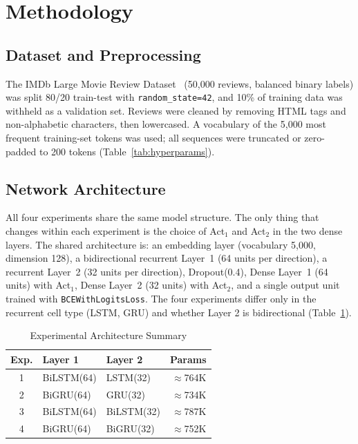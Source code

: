 \FloatBarrier
\section{Methodology}
\subsection{Dataset and Preprocessing}

The IMDb Large Movie Review Dataset~\cite{maas2011} (50,000
reviews, balanced binary labels) was split 80/20 train-test
with \texttt{random\_state=42}, and 10\% of
training data was withheld as a validation set. Reviews were
cleaned by removing HTML tags and non-alphabetic characters,
then lowercased. A vocabulary of the 5,000 most frequent
training-set tokens was used; all sequences were truncated or
zero-padded to 200 tokens (Table~\ref{tab:hyperparams}).

\subsection{Network Architecture}

All four experiments share the same model structure. The
only thing that changes within each experiment is the choice of
Act$_1$ and Act$_2$ in the two dense layers. The shared architecture
is: an embedding layer
(vocabulary 5,000, dimension 128), a bidirectional recurrent
Layer~1 (64 units per direction), a recurrent Layer~2 (32
units per direction), Dropout(0.4), Dense Layer~1 (64 units)
with Act$_1$, Dense Layer~2 (32 units) with Act$_2$, and a
single output unit trained with \texttt{BCEWithLogitsLoss}.
The four experiments differ only in the recurrent cell type
(LSTM, GRU) and whether Layer 2
is bidirectional (Table~\ref{tab:architectures}).

\begin{table}[htbp]
  \caption{Experimental Architecture Summary}
  \label{tab:architectures}
  \centering
  \footnotesize
  \setlength{\tabcolsep}{4pt}
  \renewcommand{\arraystretch}{1.08}
  \begin{tabular}{cllr}
    \toprule
    Exp. & Layer 1 & Layer 2 & Params \\
    \midrule
    1 & BiLSTM(64) & LSTM(32)    & ${\approx}$764K \\
    2 & BiGRU(64)  & GRU(32)     & ${\approx}$734K \\
    3 & BiLSTM(64) & BiLSTM(32)  & ${\approx}$787K \\
    4 & BiGRU(64)  & BiGRU(32)   & ${\approx}$752K \\
    \bottomrule
  \end{tabular}
\end{table}

